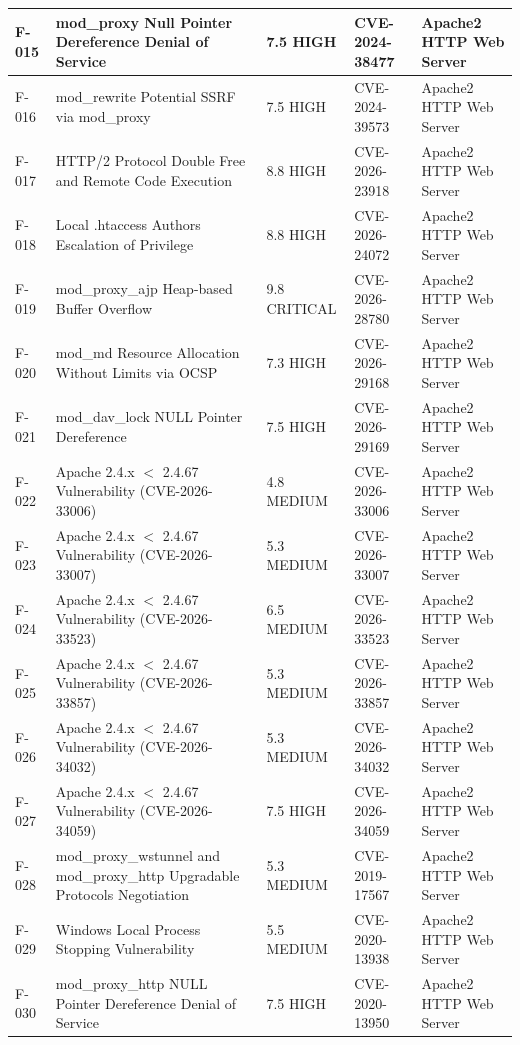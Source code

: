 \begin{longtable}{|l|p{5cm}|l|l|p{3cm}|}
F-015 & mod\_proxy Null Pointer Dereference Denial of Service & 7.5 HIGH & CVE-2024-38477 & Apache2 HTTP Web Server\\ \hline
F-016 & mod\_rewrite Potential SSRF via mod\_proxy & 7.5 HIGH & CVE-2024-39573 & Apache2 HTTP Web Server\\ \hline
F-017 & HTTP/2 Protocol Double Free and Remote Code Execution & 8.8 HIGH & CVE-2026-23918 & Apache2 HTTP Web Server\\ \hline
F-018 & Local .htaccess Authors Escalation of Privilege & 8.8 HIGH & CVE-2026-24072 & Apache2 HTTP Web Server\\ \hline
F-019 & mod\_proxy\_ajp Heap-based Buffer Overflow & 9.8 CRITICAL & CVE-2026-28780 & Apache2 HTTP Web Server\\ \hline
F-020 & mod\_md Resource Allocation Without Limits via OCSP & 7.3 HIGH & CVE-2026-29168 & Apache2 HTTP Web Server\\ \hline
F-021 & mod\_dav\_lock NULL Pointer Dereference & 7.5 HIGH & CVE-2026-29169 & Apache2 HTTP Web Server\\ \hline
F-022 & Apache 2.4.x $<$ 2.4.67 Vulnerability (CVE-2026-33006) & 4.8 MEDIUM & CVE-2026-33006 & Apache2 HTTP Web Server\\ \hline
F-023 & Apache 2.4.x $<$ 2.4.67 Vulnerability (CVE-2026-33007) & 5.3 MEDIUM & CVE-2026-33007 & Apache2 HTTP Web Server\\ \hline
F-024 & Apache 2.4.x $<$ 2.4.67 Vulnerability (CVE-2026-33523) & 6.5 MEDIUM & CVE-2026-33523 & Apache2 HTTP Web Server\\ \hline
F-025 & Apache 2.4.x $<$ 2.4.67 Vulnerability (CVE-2026-33857) & 5.3 MEDIUM & CVE-2026-33857 & Apache2 HTTP Web Server\\ \hline
F-026 & Apache 2.4.x $<$ 2.4.67 Vulnerability (CVE-2026-34032) & 5.3 MEDIUM & CVE-2026-34032 & Apache2 HTTP Web Server\\ \hline
F-027 & Apache 2.4.x $<$ 2.4.67 Vulnerability (CVE-2026-34059) & 7.5 HIGH & CVE-2026-34059 & Apache2 HTTP Web Server\\ \hline
F-028 & mod\_proxy\_wstunnel and mod\_proxy\_http Upgradable Protocols Negotiation & 5.3 MEDIUM & CVE-2019-17567 & Apache2 HTTP Web Server \\ \hline
F-029 & Windows Local Process Stopping Vulnerability & 5.5 MEDIUM & CVE-2020-13938 & Apache2 HTTP Web Server\\ \hline
F-030 & mod\_proxy\_http NULL Pointer Dereference Denial of Service & 7.5 HIGH & CVE-2020-13950 & Apache2 HTTP Web Server\\ \hline

\end{longtable}
